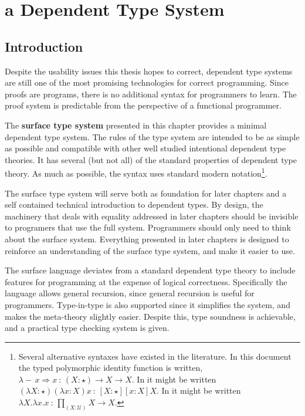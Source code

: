\chapter{a Dependent Type System}
\label{chapter:Surface}
\thispagestyle{myheadings}

\section{Introduction}

Despite the usability issues this thesis hopes to correct, dependent type systems are still one of the most promising technologies for correct programming.
Since proofs are programs, there is no additional syntax for programmers to learn.
The proof system is predictable from the perspective of a functional programmer. 

The \textbf{surface type system} presented in this chapter provides a minimal dependent type system.
The rules of the type system are intended to be as simple as possible and compatible with other well studied intentional dependent type theories.
It has several (but not all) of the standard properties of dependent type theory.
As much as possible, the syntax uses standard modern notation\footnote{
  Several alternative syntaxes have existed in the literature.
  In this document the typed polymorphic identity function is written, $\lambda-\,x\Rightarrow x\ :\,\left(X:\star\right)\rightarrow X\rightarrow X$.
  In \cite{10.1016/0890-5401(88)90005-3} it might be written $\left(\lambda X:\star\right)\left(\lambda x:X\right)x\ :\,\left[X:\star\right]\left[x:X\right]X$.
  In \cite{HoTTbook} it might be written $\lambda X.\lambda x.x\ :\,\underset{\left(X:\mathcal{U}\right)}{\prod}X\rightarrow X$.}.

The surface type system will serve both as foundation for later chapters and a self contained technical introduction to dependent types.
By design, the machinery that deals with equality addressed in later chapters should be invisible to programers that use the full system.
Programmers should only need to think about the surface system.
Everything presented in later chapters is designed to reinforce an understanding of the surface type system, and make it easier to use.

The surface language deviates from a standard dependent type theory to include features for programming at the expense of logical correctness.
Specifically the language allows general recursion, since general recursion is useful for programmers.
Type-in-type is also supported since it simplifies the system, and makes the meta-theory slightly easier.
Despite this, type soundness is achievable, and a practical type checking system is given.


